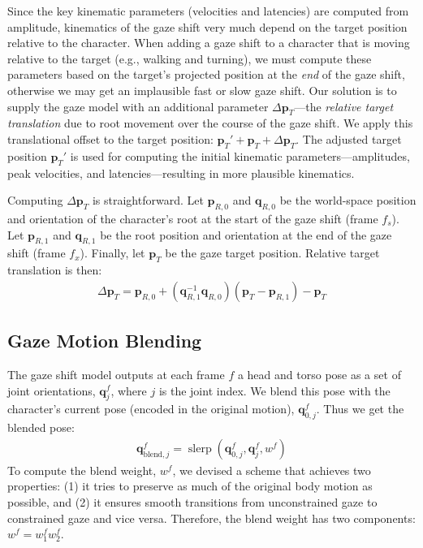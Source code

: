 Since the key kinematic parameters (velocities and latencies) are computed from amplitude, kinematics of the gaze shift very much depend on the target position relative to the character. When adding a gaze shift to a character that is moving relative to the target (e.g., walking and turning), we must compute these parameters based on the target's projected position at the \emph{end} of the gaze shift, otherwise we may get an implausible fast or slow gaze shift. Our solution is to supply the gaze model with an additional parameter $\Delta \mathbf{p}_T$---the \emph{relative target translation} due to root movement over the course of the gaze shift. We apply this translational offset to the target position: $\mathbf{p}_T' + \mathbf{p}_T + \Delta \mathbf{p}_T$. The adjusted target position $\mathbf{p}_T'$ is used for computing the initial kinematic parameters---amplitudes, peak velocities, and latencies---resulting in more plausible kinematics.

Computing $\Delta \mathbf{p}_T$ is straightforward. Let $\mathbf{p}_{R,0}$ and $\mathbf{q}_{R,0}$ be the world-space position and orientation of the character's root at the start of the gaze shift (frame $f_s$). Let $\mathbf{p}_{R,1}$ and $\mathbf{q}_{R,1}$ be the root position and orientation at the end of the gaze shift (frame $f_x$). Finally, let $\mathbf{p}_T$ be the gaze target position. Relative target translation is then:
%
\begin{align} \label{eq:GazeShiftTargetTrans}
\Delta \mathbf{p}_T = \mathbf{p}_{R,0} + (\mathbf{q}_{R,1}^{-1} \mathbf{q}_{R,0}) (\mathbf{p}_T - \mathbf{p}_{R,1}) - \mathbf{p}_T
\end{align}
%
\subsection{Gaze Motion Blending}
\label{sec:GazeMotionBlending}

The gaze shift model outputs at each frame $f$ a head and torso pose as a set of joint orientations, $\mathbf{q}_j^f$, where $j$ is the joint index. We blend this pose with the character's current pose (encoded in the original motion), $\mathbf{q}_{0,j}^f$. Thus we get the blended pose:
%
\begin{align} \label{eq:GazeShiftPoseBlend}
\mathbf{q}_{\mathrm{blend},j}^f = \mathop{slerp}(\mathbf{q}_{0,j}^f, \mathbf{q}_j^f, w^f)
\end{align}
%
To compute the blend weight, $w^f$, we devised a scheme that achieves two properties: (1) it tries to preserve as much of the original body motion as possible, and (2) it ensures smooth transitions from unconstrained gaze to constrained gaze and vice versa. Therefore, the blend weight has two components: $w^f = w_1^f w_2^f$.

